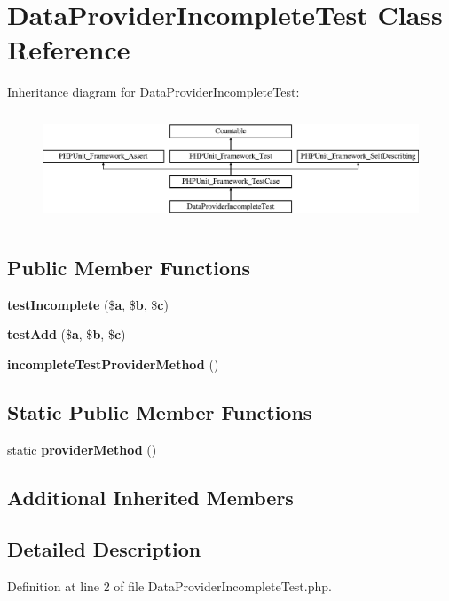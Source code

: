 \section{Data\+Provider\+Incomplete\+Test Class Reference}
\label{class_data_provider_incomplete_test}
Inheritance diagram for Data\+Provider\+Incomplete\+Test\+:\begin{figure}[H]
\begin{center}
\leavevmode
\includegraphics[height=3.303835cm]{class_data_provider_incomplete_test}
\end{center}
\end{figure}
\subsection*{Public Member Functions}
\begin{DoxyCompactItemize}
\item 
{\bf test\+Incomplete} (\${\bf a}, \${\bf b}, \${\bf c})
\item 
{\bf test\+Add} (\${\bf a}, \${\bf b}, \${\bf c})
\item 
{\bf incomplete\+Test\+Provider\+Method} ()
\end{DoxyCompactItemize}
\subsection*{Static Public Member Functions}
\begin{DoxyCompactItemize}
\item 
static {\bf provider\+Method} ()
\end{DoxyCompactItemize}
\subsection*{Additional Inherited Members}


\subsection{Detailed Description}


Definition at line 2 of file Data\+Provider\+Incomplete\+Test.\+php.



